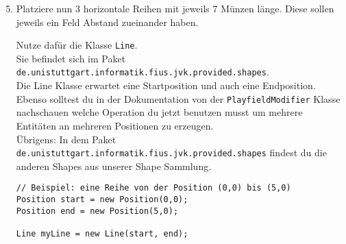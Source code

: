 \begin{enumerate} \setcounter{enumi}{4}
    \item Platziere nun 3 horizontale Reihen mit jeweils 7 Münzen länge.
        Diese sollen jeweils ein Feld Abstand zueinander haben.

        Nutze dafür die Klasse \lstinline{Line}.\\
        Sie befindet sich im Paket \texttt{de.unistuttgart.informatik.fius.jvk.provided.shapes}.\\

        Die Line Klasse erwartet eine Startposition und auch eine Endposition.\\
        Ebenso solltest du in der Dokumentation von der \lstinline{PlayfieldModifier} Klasse nachschauen welche Operation du jetzt benutzen musst um mehrere Entitäten an mehreren Positionen zu erzeugen.\\

        Übrigens: In dem Paket \texttt{de.unistuttgart.informatik.fius.jvk.provided.shapes} findest du die anderen Shapes aus unserer Shape Sammlung.

    \begin{lstlisting}
// Beispiel: eine Reihe von der Position (0,0) bis (5,0)
Position start = new Position(0,0);
Position end = new Position(5,0);

Line myLine = new Line(start, end);
    \end{lstlisting}

\end{enumerate}
